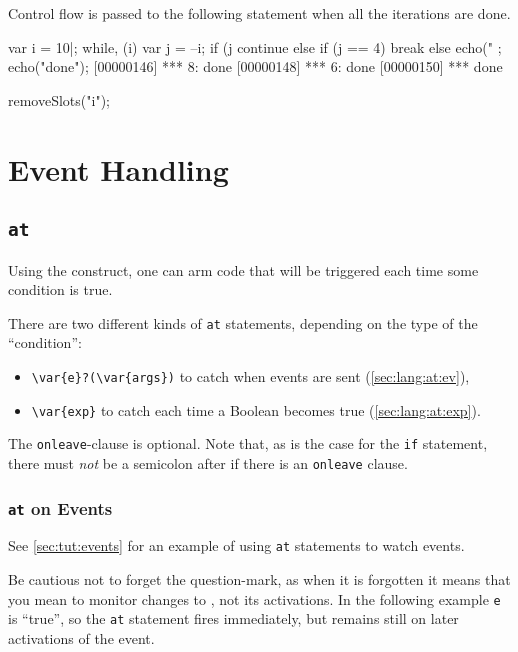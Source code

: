 Control flow is passed to the following statement when all the iterations
are done.

\begin{urbiscript}
var i = 10|;
while, (i)
{
  var j = --i;
  if (j %
    continue
  else if (j == 4)
    break
  else
    echo("%
};
echo("done");
[00000146] *** 8: done
[00000148] *** 6: done
[00000150] *** done
\end{urbiscript}
\begin{urbicomment}
removeSlots("i");
\end{urbicomment}


\section{Event Handling}
\label{sec:lang:event}
\subsection{\lstinline{at}}
\label{sec:lang:at}
Using the  construct, one can arm code that will be
triggered each time some condition is true.


There are two different kinds of \lstinline{at} statements, depending on the
type of the ``condition'':
\begin{itemize}
\item \lstinline|\var{e}?(\var{args})| to catch when events are sent
  (\autoref{sec:lang:at:ev}),
\item \lstinline|\var{exp}| to catch each time a Boolean  becomes
  true (\autoref{sec:lang:at:exp}).
\end{itemize}

The \lstinline{onleave}-clause is optional.  Note that, as is the case for
the \lstinline{if} statement, there must \emph{not} be a semicolon after
 if there is an \lstinline{onleave} clause.

\subsubsection{\lstinline{at} on Events}
\label{sec:lang:at:ev}

See \autoref{sec:tut:events} for an example of using \lstinline{at}
statements to watch events.

Be cautious not to forget the question-mark, as when it is forgotten it
means that you mean to monitor changes to , not its activations.
In the following example \lstinline{e} is ``true'', so the \lstinline{at}
statement fires immediately, but remains still on later activations of the
event.


